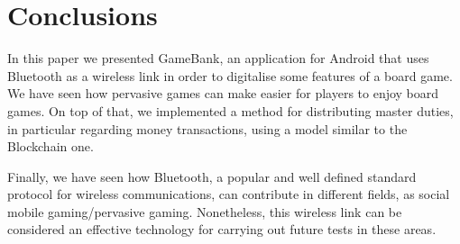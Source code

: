 \section{Conclusions}
\label{conclusions}

In this paper we presented GameBank, an application for Android that uses 
Bluetooth as a wireless link in order to digitalise some features of a board 
game. We have seen how pervasive games can make easier for players to enjoy 
board games. On top of that, we implemented a method for distributing master 
duties, in particular regarding money transactions, using a model similar to 
the Blockchain one.

Finally, we have seen how Bluetooth, a popular and well defined standard 
protocol for wireless communications, can contribute in different fields, as 
social mobile gaming/pervasive gaming. Nonetheless, this wireless link can be 
considered an effective technology for carrying out future tests in these areas.